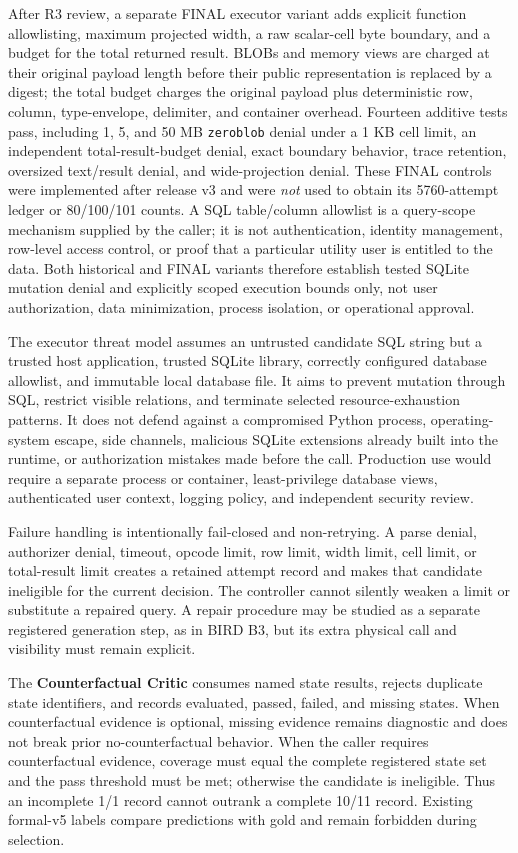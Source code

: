 \documentclass[applsci,article,submit,moreauthors]{Definitions/mdpi}
\begin{document}
After R3 review, a separate FINAL executor variant adds explicit function allowlisting, maximum projected width, a raw scalar-cell byte boundary, and a budget for the total returned result. BLOBs and memory views are charged at their original payload length before their public representation is replaced by a digest; the total budget charges the original payload plus deterministic row, column, type-envelope, delimiter, and container overhead. Fourteen additive tests pass, including 1, 5, and 50 MB \texttt{zeroblob} denial under a 1 KB cell limit, an independent total-result-budget denial, exact boundary behavior, trace retention, oversized text/result denial, and wide-projection denial. These FINAL controls were implemented after release v3 and were \emph{not} used to obtain its 5760-attempt ledger or 80/100/101 counts. A SQL table/column allowlist is a query-scope mechanism supplied by the caller; it is not authentication, identity management, row-level access control, or proof that a particular utility user is entitled to the data. Both historical and FINAL variants therefore establish tested SQLite mutation denial and explicitly scoped execution bounds only, not user authorization, data minimization, process isolation, or operational approval.

The executor threat model assumes an untrusted candidate SQL string but a trusted host application, trusted SQLite library, correctly configured database allowlist, and immutable local database file. It aims to prevent mutation through SQL, restrict visible relations, and terminate selected resource-exhaustion patterns. It does not defend against a compromised Python process, operating-system escape, side channels, malicious SQLite extensions already built into the runtime, or authorization mistakes made before the call. Production use would require a separate process or container, least-privilege database views, authenticated user context, logging policy, and independent security review.

Failure handling is intentionally fail-closed and non-retrying. A parse denial, authorizer denial, timeout, opcode limit, row limit, width limit, cell limit, or total-result limit creates a retained attempt record and makes that candidate ineligible for the current decision. The controller cannot silently weaken a limit or substitute a repaired query. A repair procedure may be studied as a separate registered generation step, as in BIRD B3, but its extra physical call and visibility must remain explicit.

The \textbf{Counterfactual Critic} consumes named state results, rejects duplicate state identifiers, and records evaluated, passed, failed, and missing states. When counterfactual evidence is optional, missing evidence remains diagnostic and does not break prior no-counterfactual behavior. When the caller requires counterfactual evidence, coverage must equal the complete registered state set and the pass threshold must be met; otherwise the candidate is ineligible. Thus an incomplete 1/1 record cannot outrank a complete 10/11 record. Existing formal-v5 labels compare predictions with gold and remain forbidden during selection.
\end{document}
